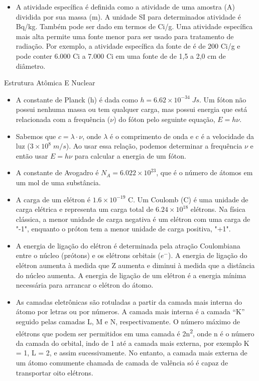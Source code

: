 \documentclass[11pt,a4paper]{article}
\newcounter{exemplo}
\begin{document}
\begin{exemplo}
\begin{itemize}
        \item A atividade específica é definida como a atividade de uma amostra (A) dividida por sua massa (m). A unidade SI para determinados atividade é Bq/kg. Também pode ser dado em termos de  Ci/g. Uma atividade específica mais alta permite uma fonte menor para ser usado para tratamento de radiação. Por exemplo, a atividade específica da fonte de  é de 200 Ci/g e pode conter 6.000 Ci a 7.000 Ci em uma fonte de  de 1,5 a 2,0 cm de diâmetro.
        
    \end{itemize}
    \textcolor{CarnationPink}{Estrutura Atômica E Nuclear}
    \begin{itemize}
        \item A constante de Planck (h) é dada como $h = 6.62 \times 10^{-34} \; J s$. Um fóton não possui nenhuma massa ou tem qualquer carga, mas possui energia que está relacionada com a frequência ($\nu$) do fóton pelo seguinte equação, $E = h\nu$.
        
        \item Sabemos que $c = \lambda \cdot \nu$, onde $\lambda$ é o comprimento de onda e c é a velocidade da luz ($3 \times 10^{8} \; m/s$). Ao usar essa relação, podemos determinar a frequência $\nu$ e então usar $E = h \nu$ para calcular a energia de um fóton.
        
        \item A constante de Avogadro é $N_A = 6.022 \times 10^{23}$, que é o número de átomos em um mol de uma substância.
        
        \item A carga de um elétron é $1.6 \times 10^{-19}$ C. Um Coulomb (C) é uma unidade de carga elétrica e representa um carga total de $6.24 \times 10^{18}$ elétrons. Na física clássica, a menor unidade de carga negativa é um elétron com
        uma carga de "-1", enquanto o próton tem a menor unidade de carga positiva, "+1".

        \item A energia de ligação do elétron é determinada pela atração Coulombiana entre o núcleo (prótons) e os elétrons orbitais ($e^{-}$). A energia de ligação do elétron aumenta à medida que Z aumenta e diminui à medida que a distância do núcleo aumenta. A energia de ligação de um elétron é a energia mínima necessária para arrancar o elétron do átomo.
        
        \item As camadas eletrônicas são rotuladas a partir da camada mais interna do átomo por letras ou por números. A camada mais interna é a camada “K” seguido pelas camadas L, M e N, respectivamente. O número máximo de elétrons que podem ser permitidos em uma camada é 2n\textsuperscript{2}, onde n é o número da camada do orbital, indo de 1 até a camada mais externa, por exemplo K = 1, L = 2, e assim sucessivamente. No entanto, a camada mais externa de um átomo comumente chamada de camada de valência só é capaz de transportar oito elétrons.
        

\end{itemize}
\end{exemplo}
\end{document}
